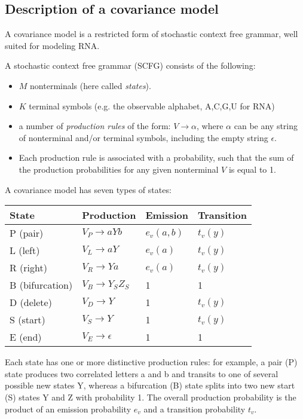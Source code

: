 \documentclass[11pt]{article}
\begin{document}
\subsection{Description of a covariance model}

A covariance model is a restricted form of stochastic context free
grammar, well suited for modeling RNA.

A stochastic context free grammar (SCFG) consists of the following:

\begin{itemize}
\item $M$ nonterminals (here called \emph{states}).
\item $K$ terminal symbols (e.g. the observable alphabet, {A,C,G,U} for RNA)
\item a number of \emph{production rules} of the form:
      $V \rightarrow \alpha$,
      where $\alpha$ can be any string of nonterminal and/or terminal
      symbols, including the empty string
      $\epsilon$.
\item Each production rule is associated with a probability, such that
      the sum of the production probabilities for any given
      nonterminal $V$ is equal to 1.
\end{itemize} 

A covariance model has seven types of states:

\begin{tabular}{llll}
State              &  Production             & Emission & Transition\\ \hline
P (pair)           & $V_P \rightarrow a Y b$ & $e_v(a,b)$ & $t_v(y)$  \\
L (left)           & $V_L \rightarrow a Y$   & $e_v(a)$   & $t_v(y)$  \\
R (right)          & $V_R \rightarrow Y a$   & $e_v(a)$   & $t_v(y)$  \\
B (bifurcation)    & $V_B \rightarrow Y_S Z_S$  & 1     &     1     \\ \hline
D (delete)         & $V_D \rightarrow Y$     &    1     &   $t_v(y)$  \\
S (start)          & $V_S \rightarrow Y$     &    1     &   $t_v(y)$  \\
E (end)            & $V_E \rightarrow \epsilon$ & 1     &     1     \\
\end{tabular}

Each state has one or more distinctive production rules: for example,
a pair (P) state produces two correlated letters a and b and transits
to one of several possible new states Y, whereas a bifurcation (B)
state splits into two new start (S) states Y and Z with probability 1.
The overall production probability is the product of an emission
probability $e_v$ and a transition probability $t_v$. 
\end{document}

